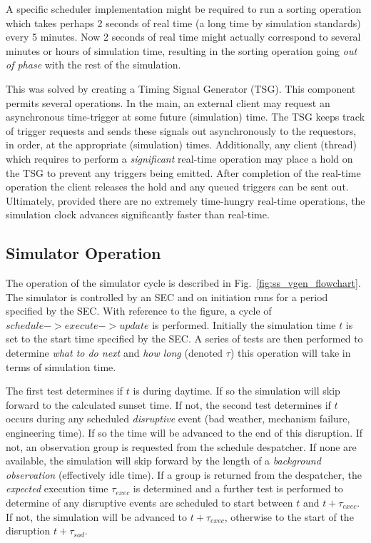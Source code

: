  A specific scheduler implementation might be required to run a sorting operation which takes perhaps 2 seconds of real time (a long time by simulation standards) every 5 minutes. Now 2 seconds of real time might actually correspond to several minutes or hours of simulation time, resulting in the sorting operation going \emph{out of phase} with the rest of the simulation. 

 This was solved by creating a Timing Signal Generator (TSG). This component permits several operations. In the main, an external client may request an asynchronous time-trigger at some future (simulation) time. The TSG keeps track of trigger requests and sends these signals out asynchronously to the requestors, in order, at the appropriate (simulation) times. Additionally, any client (thread) which requires to perform a \emph{significant} real-time operation may place a hold on the TSG to prevent any triggers being emitted. After completion of the real-time operation the client releases the hold and any queued triggers can be sent out. Ultimately, provided there are no extremely time-hungry real-time operations, the simulation clock advances significantly faster than real-time.

\subsection{Simulator Operation}
\label{ss:sim_ops}
The operation of the simulator cycle is described in Fig.~\ref{fig:ss_vgen_flowchart}. The simulator is controlled by an SEC and on initiation runs for a period specified by the SEC. With reference to the figure, a cycle of $schedule->execute->update$ is performed. Initially the simulation time $t$ is set to the start time specified by the SEC. A series of tests are then performed to determine \emph{what to do next} and \emph{how long} (denoted $\tau$) this operation will take in terms of simulation time. 

The first test determines if $t$ is during daytime. If so the simulation will skip forward to the calculated sunset time. If not, the second test determines if $t$ occurs during any scheduled \emph{disruptive} event (bad weather, mechanism failure, engineering time). If so the time will be advanced to the end of this disruption. If not, an observation group is requested from the schedule despatcher. If none are available, the simulation will skip forward by the length of a \emph{background observation} (effectively idle time). If a group is returned from the despatcher, the \emph{expected} execution time $\tau_{exec}$ is determined and a further test is performed to determine of any disruptive events are scheduled to start between $t$ and $t+\tau_{exec}$. If not, the simulation will be advanced to $t+\tau_{exec}$, otherwise to the start of the disruption $t+\tau_{sod}$. 

